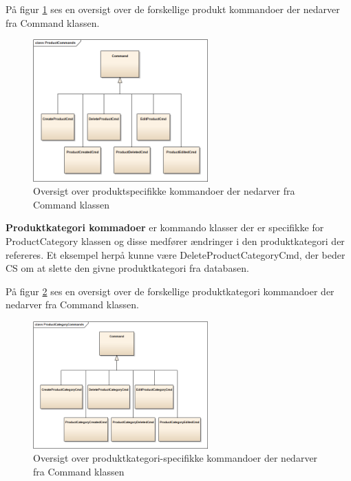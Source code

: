 På figur \ref{fig:overklassePrd} ses en oversigt over de forskellige produkt kommandoer der nedarver fra Command klassen.

\begin{figure}[H]
    \centering
    \includegraphics[width=0.6\textwidth]{Systemdesign/SharedLib/Images/Commands/ProductCommands.png}
    \caption{Oversigt over produktspecifikke kommandoer der nedarver fra Command klassen}
    \label{fig:overklassePrd}
\end{figure}

\textbf{Produktkategori kommadoer} er kommando klasser der er specifikke for ProductCategory klassen og disse medfører ændringer i den produktkategori der refereres. Et eksempel herpå kunne være DeleteProductCategoryCmd, der beder \gls{CS} om at slette den givne produktkategori fra databasen.

På figur \ref{fig:overklassePrdCat} ses en oversigt over de forskellige produktkategori kommandoer der nedarver fra Command klassen.

\begin{figure}[H]
    \centering
    \includegraphics[width=0.6\textwidth]{Systemdesign/SharedLib/Images/Commands/ProductCategoryCommands.png}
    \caption{Oversigt over produktkategori-specifikke kommandoer der nedarver fra Command klassen}
    \label{fig:overklassePrdCat}
\end{figure}




